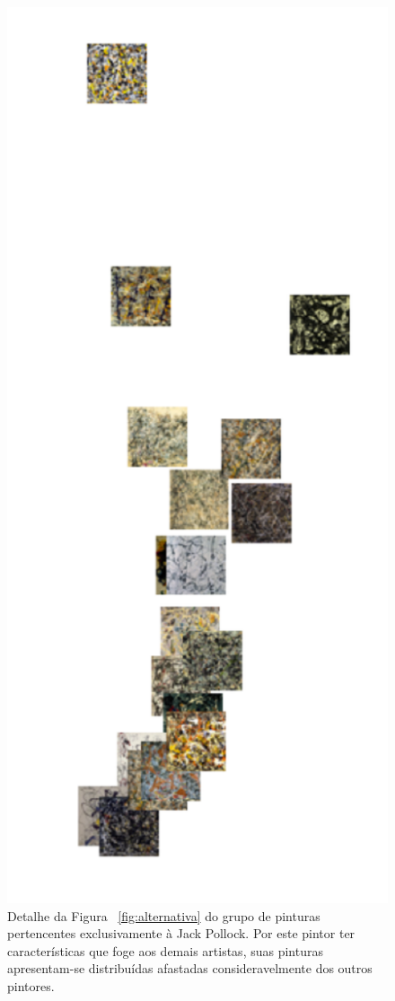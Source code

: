 \begin{figure}[h!]
  \begin{center}
    \includegraphics[scale=.4]{figs/detalhe2.pdf}
  \end{center}
  \caption{Detalhe da Figura ~\ref{fig:alternativa} do grupo de pinturas
    pertencentes exclusivamente à Jack Pollock. Por este pintor ter
    características que foge aos demais artistas, suas pinturas apresentam-se
    distribuídas afastadas consideravelmente dos outros pintores.}
  \label{fig:alternativa2}
\end{figure}

